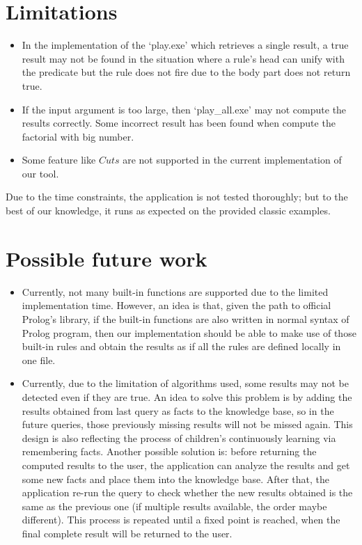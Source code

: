 \documentclass[11pt,a4paper]{report}
\begin{document}
\section*{Limitations}
\begin{itemize}
	\item In the implementation of the `play.exe' which retrieves a single result, a true result may not be found in the situation where a rule's head can unify with the predicate but the rule does not fire due to the body part does not return true. \\
	
	\item If the input argument is too large, then `play\_all.exe' may not compute the results correctly. Some incorrect result has been found when compute the factorial with big number.
	
	\item Some feature like $Cuts$ are not supported in the current implementation of our tool.
\end{itemize}

Due to the time constraints, the application is not tested thoroughly; but to the best of our knowledge, it runs as expected on the provided classic examples.


\section*{Possible future work}
\begin{itemize}
	\item Currently, not many built-in functions are supported due to the limited implementation time. However, an idea is that, given the path to official Prolog's library, if the built-in functions are also written in normal syntax of Prolog program, then our implementation should be able to make use of those built-in rules and obtain the results as if all the rules are defined locally in one file.
	
	\item Currently, due to the limitation of algorithms used, some results may not be detected even if they are true. An idea to solve this problem is by adding the results obtained from last query as facts to the knowledge base, so in the future queries, those previously missing results will not be missed again. This design is also reflecting the process of  children's continuously learning via remembering facts. Another possible solution is: before returning the computed results to the user, the application can analyze the results and get some new facts and place them into the knowledge base. After that, the application re-run the query to check whether the new results obtained is the same as the previous one (if multiple results available, the order maybe different). This process is repeated until a fixed point is reached, when the final complete result will be returned to the user. 
\end{itemize}
\end{document}
